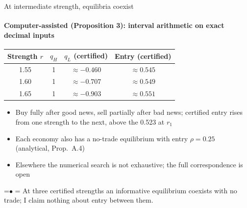 \documentclass[10pt,aspectratio=169]{beamer}
\newcommand{\Status}[1]{{\color{cGrayText}\scriptsize #1}}
\newcommand{\TakeawayBody}[1]{\begin{minipage}{\textwidth}\raggedright\normalsize
    \setbox0=\hbox{{\usebeamercolor[fg]{structure}\raise0.7pt\hbox{\scriptsize$\bullet$}}\hspace{0.55em}}%
    \hangindent=\wd0 \hangafter=1 \noindent\box0 #1\par
  \end{minipage}}
\renewcommand{\TakeawayWithNav}[2][\ExhibitReadingGap]{\par\vspace{#1}\noindent\TakeawayBody{#2}\par\vspace{0.45cm}}
\begin{document}
\begin{frame}[label=F12]{At intermediate strength, equilibria coexist}
\framesubtitle{Computer-assisted (Proposition 3): interval arithmetic on exact decimal inputs}
\hypertarget{main:corr}{}
\vspace{4pt}
\begin{center}\small
\renewcommand{\arraystretch}{1.2}
\begin{tabular*}{0.92\textwidth}{@{\extracolsep{\fill}}cccc@{}}
\toprule
Strength $r$ & $q_H$ & $q_L$ (certified) & Entry (certified)\\
\midrule
1.55 %
 & 1 & $\approx-0.460$ %
 & $\approx0.545$\\ %
1.60 %
 & 1 & $\approx-0.707$ %
 & $\approx0.549$\\ %
1.65 %
 & 1 & $\approx-0.903$ %
 & $\approx0.551$\\ %
\bottomrule
\end{tabular*}
\end{center}
\vspace{-4pt}
\begin{itemize}\setlength{\itemsep}{3pt}
\item Buy fully after good news, sell partially after bad news; certified entry rises from one strength to the next, above the 0.523 at $r_1$ %
\item Each economy also has a no-trade equilibrium with entry $\rho=0.25$ %
\Status{(analytical, Prop.~A.4)}
\item Elsewhere the numerical search is not exhaustive; the full correspondence is open
\end{itemize}
\TakeawayWithNav{At three certified strengths an informative equilibrium coexists with no trade; I claim nothing about entry between them.}
\end{frame}
\end{document}
